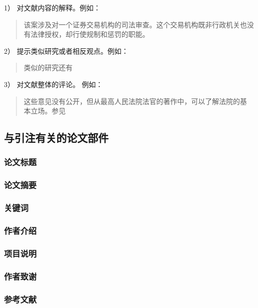 \documentclass{article}
\begin{document}
1） 对文献内容的解释。例如：

\begin{quotation}
 该案涉及对一个证券交易机构的司法审查。这个交易机构既非行政机关也没有法律授权，却行使规制和惩罚的职能。
\end{quotation}

2） 提示类似研究或者相反观点。例如：

\begin{quotation}
 类似的研究还有 
\end{quotation}

3） 对文献整体的评论。 例如：

\begin{quotation}
这些意见没有公开，但从最高人民法院法官的著作中，可以了解法院的基
本立场。参见
\end{quotation}

\subsection{与引注有关的论文部件}

\subsubsection{论文标题}

\subsubsection{论文摘要}

\subsubsection{关键词}

\subsubsection{作者介绍}

\subsubsection{项目说明}

\subsubsection{作者致谢}

\subsubsection{参考文献}
\end{document}
